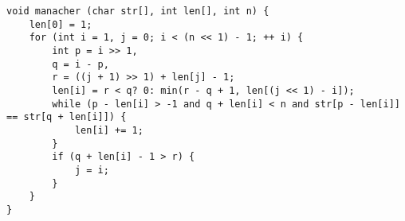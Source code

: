 \begin{lstlisting}
void manacher (char str[], int len[], int n) {
	len[0] = 1;
	for (int i = 1, j = 0; i < (n << 1) - 1; ++ i) {
		int p = i >> 1,
		q = i - p,
		r = ((j + 1) >> 1) + len[j] - 1;
		len[i] = r < q? 0: min(r - q + 1, len[(j << 1) - i]);
		while (p - len[i] > -1 and q + len[i] < n and str[p - len[i]] == str[q + len[i]]) {
			len[i] += 1;
		}
		if (q + len[i] - 1 > r) {
			j = i;
		}
	}
}
\end{lstlisting}
